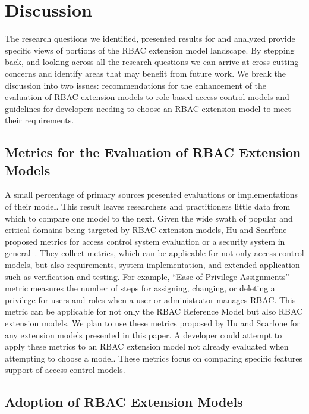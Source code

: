\section{Discussion} \label{sec:discussion}

The research questions we identified, presented results for and analyzed provide specific views of portions of the RBAC extension model landscape. 
By stepping back, and looking across all the research questions we can arrive at cross-cutting concerns and identify areas that may benefit from future work.
We break the discussion into two issues: recommendations for the enhancement of the evaluation of RBAC extension models to role-based access control models and guidelines for developers needing to choose an RBAC extension model to meet their requirements.

\subsection{Metrics for the Evaluation of RBAC Extension Models}

A small percentage of primary sources presented evaluations or implementations of their model. This result leaves researchers and practitioners little data from which to compare one model to the next. Given the wide swath of popular and critical domains being targeted by RBAC extension models, Hu and Scarfone proposed metrics for access control system evaluation or a security system in general~\cite{hu2012:NIST7874}. They collect metrics, which can be applicable for not only access control models, but also requirements, system implementation, and extended application such as verification and testing. For example, ``Ease of Privilege Assignments'' metric measures the number of steps for assigning, changing, or deleting a privilege for users and roles when a user or administrator manages RBAC. This metric can be applicable for not only the RBAC Reference Model but also RBAC extension models.
We plan to use these metrics proposed by Hu and Scarfone for any extension models presented in this paper. 
A developer could attempt to apply these metrics to an RBAC extension model not already evaluated when attempting to choose a model. 
These metrics focus on comparing specific features support of access control models.


\subsection{Adoption of RBAC Extension Models}

